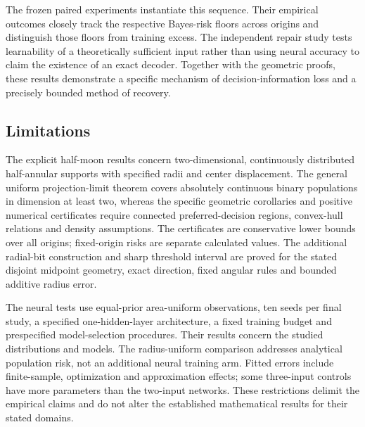 \documentclass[12pt,a4paper]{article}
\begin{document}
The frozen paired experiments instantiate this sequence. Their empirical outcomes closely track the respective Bayes-risk floors across origins and distinguish those floors from training excess. The independent repair study tests learnability of a theoretically sufficient input rather than using neural accuracy to claim the existence of an exact decoder. Together with the geometric proofs, these results demonstrate a specific mechanism of decision-information loss and a precisely bounded method of recovery.

\subsection{Limitations}
The explicit half-moon results concern two-dimensional, continuously distributed half-annular supports with specified radii and center displacement. The general uniform projection-limit theorem covers absolutely continuous binary populations in dimension at least two, whereas the specific geometric corollaries and positive numerical certificates require connected preferred-decision regions, convex-hull relations and density assumptions. The certificates are conservative lower bounds over all origins; fixed-origin risks are separate calculated values. The additional radial-bit construction and sharp threshold interval are proved for the stated disjoint midpoint geometry, exact direction, fixed angular rules and bounded additive radius error.

The neural tests use equal-prior area-uniform observations, ten seeds per final study, a specified one-hidden-layer architecture, a fixed training budget and prespecified model-selection procedures. Their results concern the studied distributions and models. The radius-uniform comparison addresses analytical population risk, not an additional neural training arm. Fitted errors include finite-sample, optimization and approximation effects; some three-input controls have more parameters than the two-input networks. These restrictions delimit the empirical claims and do not alter the established mathematical results for their stated domains.
\end{document}
